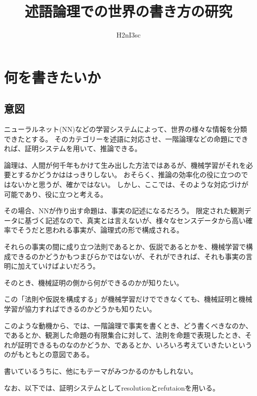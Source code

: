 \documentclass[10pt, oneside]{jarticle}   	%
\title{述語論理での世界の書き方の研究}
\author{H2nI3sc}
\theoremstyle{definition}
\begin{document}
\maketitle

\section{何を書きたいか}
\subsection{意図}
ニューラルネット(NN)などの学習システムによって、世界の様々な情報を分類できたとする。
そのカテゴリーを述語に対応させ、一階論理などの命題にできれば、証明システムを用いて、推論できる。

論理は、人間が何千年もかけて生み出した方法ではあるが、機械学習がそれを必要とするかどうかははっきりしない。
おそらく、推論の効率化の役に立つのではないかと思うが、確かではない。
しかし、ここでは、そのような対応づけが可能であり、役に立つと考える。

その場合、NNが作り出す命題は、事実の記述になるだろう。
限定された観測データに基づく記述なので、真実とは言えないが、様々なセンスデータから高い確率でそうだと思われる事実が、論理式の形で構成される。

それらの事実の間に成り立つ法則であるとか、仮説であるとかを、機械学習で構成できるのかどうかもつまびらかではないが、それができれば、それも事実の言明に加えていけばよいだろう。

そのとき、機械証明の側から何ができるのかが知りたい。

この「法則や仮説を構成する」が機械学習だけでできなくても、機械証明と機械学習が協力すればできるのかどうかも知りたい。

このような動機から、では、一階論理で事実を書くとき、どう書くべきなのか、であるとか、観測した命題の有限集合に対して、法則を命題で表現したとき、それが証明できるものなのかどうか、であるとか、いろいろ考えていきたいというのがもともとの意図である。

書いているうちに、他にもテーマがみつかるのかもしれない。

なお、以下では、証明システムとしてresolutionとrefutaionを用いる。
\end{document}

